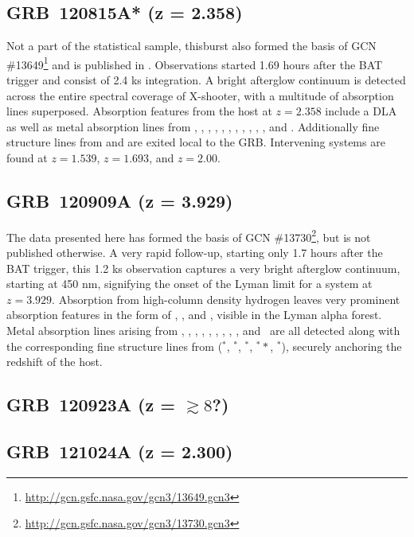 \documentclass{aa}    %
\begin{document}
\subsection{GRB~120815A* (z = 2.358)} 
Not a part of the statistical sample, thisburst also formed the basis of  GCN
\#13649\footnote{\url{http://gcn.gsfc.nasa.gov/gcn3/13649.gcn3}} and is
published in \citet{Kruhler2013}. Observations started 1.69 hours after the BAT
trigger and consist of 2.4 ks integration. A bright afterglow continuum is
detected across the entire spectral coverage of X-shooter, with a multitude of
absorption lines superposed. Absorption features from the host at $z = 2.358$
include a DLA as well as metal absorption lines from \nv, \sii, \SIii, \oi,
\civ, \SIiv, \feii, \alii, \aliii, \mnii, \mgii, and \mgi. Additionally
fine structure lines from \NIii and \feii are exited local to the GRB.
Intervening systems are found at $z = 1.539$, $z = 1.693$, and $z = 2.00$.


\subsection{GRB~120909A (z = 3.929)}
The data presented here has formed the basis of GCN \#13730\footnote{\url{http://gcn.gsfc.nasa.gov/gcn3/13730.gcn3}}, but is not
published otherwise. A very rapid follow-up, starting only 1.7 hours after the
BAT trigger, this 1.2 ks observation captures a very bright afterglow
continuum, starting at 450 nm, signifying the onset of the Lyman limit for a 
system at $z = 3.929$. Absorption from high-column density hydrogen leaves very
prominent absorption features in the form of \lya, \lyb, and \lyg, visible in
the Lyman alpha forest. Metal absorption lines arising from \feii, \NIii,
\SIii, \sii, \alii, \aliii, \cii, \oi, \civ, and \znii~are all detected along
with the corresponding fine structure lines from (\feii$^*$, \SIii$^*$,
\oi$^*$, \oi$^**$, \cii$^*$), securely anchoring the redshift of the host.




\subsection{GRB~120923A (z = $\gtrsim8$?)}






\subsection{GRB~121024A (z = 2.300)}
\end{document}
